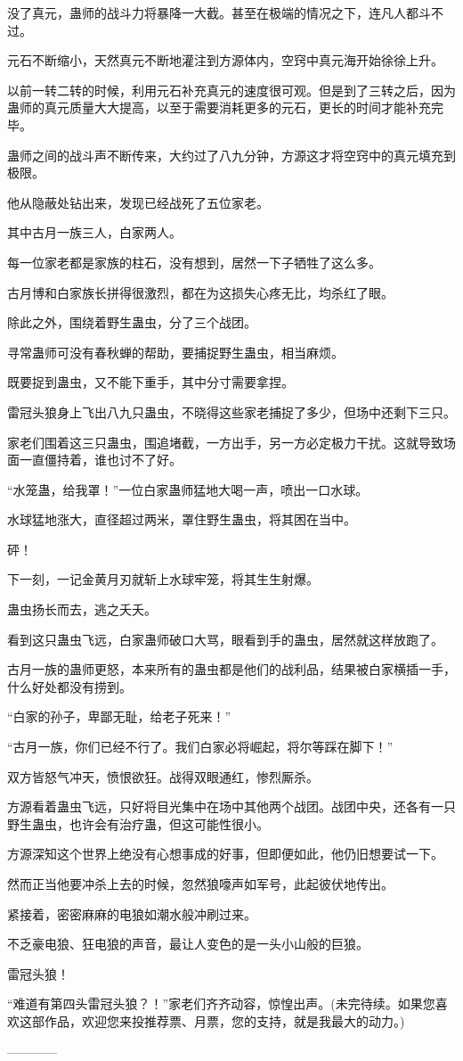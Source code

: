 \begin{this_body}
没了真元，蛊师的战斗力将暴降一大截。甚至在极端的情况之下，连凡人都斗不过。

元石不断缩小，天然真元不断地灌注到方源体内，空窍中真元海开始徐徐上升。

以前一转二转的时候，利用元石补充真元的速度很可观。但是到了三转之后，因为蛊师的真元质量大大提高，以至于需要消耗更多的元石，更长的时间才能补充完毕。

蛊师之间的战斗声不断传来，大约过了八九分钟，方源这才将空窍中的真元填充到极限。

他从隐蔽处钻出来，发现已经战死了五位家老。

其中古月一族三人，白家两人。

每一位家老都是家族的柱石，没有想到，居然一下子牺牲了这么多。

古月博和白家族长拼得很激烈，都在为这损失心疼无比，均杀红了眼。

除此之外，围绕着野生蛊虫，分了三个战团。

寻常蛊师可没有春秋蝉的帮助，要捕捉野生蛊虫，相当麻烦。

既要捉到蛊虫，又不能下重手，其中分寸需要拿捏。

雷冠头狼身上飞出八九只蛊虫，不晓得这些家老捕捉了多少，但场中还剩下三只。

家老们围着这三只蛊虫，围追堵截，一方出手，另一方必定极力干扰。这就导致场面一直僵持着，谁也讨不了好。

“水笼蛊，给我罩！”一位白家蛊师猛地大喝一声，喷出一口水球。

水球猛地涨大，直径超过两米，罩住野生蛊虫，将其困在当中。

砰！

下一刻，一记金黄月刃就斩上水球牢笼，将其生生射爆。

蛊虫扬长而去，逃之夭夭。

看到这只蛊虫飞远，白家蛊师破口大骂，眼看到手的蛊虫，居然就这样放跑了。

古月一族的蛊师更怒，本来所有的蛊虫都是他们的战利品，结果被白家横插一手，什么好处都没有捞到。

“白家的孙子，卑鄙无耻，给老子死来！”

“古月一族，你们已经不行了。我们白家必将崛起，将尔等踩在脚下！”

双方皆怒气冲天，愤恨欲狂。战得双眼通红，惨烈厮杀。

方源看着蛊虫飞远，只好将目光集中在场中其他两个战团。战团中央，还各有一只野生蛊虫，也许会有治疗蛊，但这可能性很小。

方源深知这个世界上绝没有心想事成的好事，但即便如此，他仍旧想要试一下。

然而正当他要冲杀上去的时候，忽然狼嚎声如军号，此起彼伏地传出。

紧接着，密密麻麻的电狼如潮水般冲刷过来。

不乏豪电狼、狂电狼的声音，最让人变色的是一头小山般的巨狼。

雷冠头狼！

“难道有第四头雷冠头狼？！”家老们齐齐动容，惊惶出声。(未完待续。如果您喜欢这部作品，欢迎您来投推荐票、月票，您的支持，就是我最大的动力。)

------------

\end{this_body}

